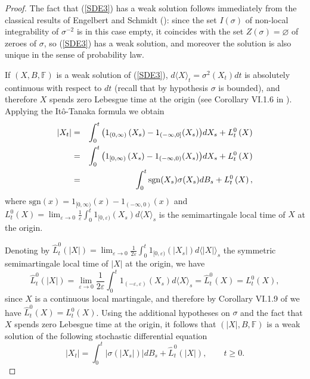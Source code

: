 \documentclass[reqno]{amsart}
\theoremstyle{definition}
\theoremstyle{remark}
\numberwithin{equation}{section}
\begin{document}
\begin{proof}
The fact that (\ref{SDE3}) has a weak solution follows immediately from the classical results of Engelbert and Schmidt (\cite{Engelbert-Schmidt}): since the set $I(\sigma)$ of non-local integrability of $\sigma^{-2}$ is in this case empty, it coincides with the set $Z(\sigma)=\varnothing$ of zeroes of $\sigma$, so (\ref{SDE3}) has a weak solution, and moreover the solution is also unique in the sense of probability law.

If $\left( X,B,\mathbb{F}\right) $ is a weak solution of (\ref{SDE3}), $d \langle X \rangle_t=\sigma^2(X_t) dt$ is absolutely continuous with respect to $dt$ (recall that by hypothesis $\sigma$ is bounded), and therefore $X$ spends zero Lebesgue time at the origin (see Corollary VI.1.6 in \cite{Revuz and Yor}). Applying the It\^{o}-Tanaka formula we obtain\begin{eqnarray}
\left\vert X_{t}\right\vert &=&\int_{0}^{t}\big(1_{(0,\infty)}\left( X_{s}\right)-1_{(-\infty,0]}(X_s)\big)dX_s+L_{t}^{0}\left( X\right) \notag\label{equation for |X|}\\
&=&\int_{0}^{t}\big(1_{[0,\infty)}\left( X_{s}\right)-1_{(-\infty,0)}(X_s)\big)dX_s+L_{t}^{0}\left( X\right) \notag\\
&=&\int_{0}^{t}\mathrm{sgn}(X_s)\sigma(X_s) dB_s+L_{t}^{0}\left( X\right),\notag
\end{eqnarray}where $\mathrm{sgn}(x)=1_{[0,\infty)}(x)-1_{(-\infty,0)}(x)$ and $L_t^0(X)=\lim_{\varepsilon\rightarrow0}\frac1\varepsilon\int_0^t 1_{[0,\varepsilon)}(X_s)d\langle X\rangle_s$ is the semimartingale local time of $X$ at the origin.

Denoting by $\widehat{L}^0_t(\vert X\vert)=\lim_{\varepsilon\rightarrow0}\frac1{2\varepsilon}\int_0^t 1_{[0,\varepsilon)}(\vert X_s\vert )d\langle \vert X\vert \rangle_s$ the symmetric semimartingale local time of $\vert X\vert$ at the origin, we have $$\widehat{L}^0_t(\vert X\vert)=\lim_{\varepsilon\rightarrow0}\frac1{2\varepsilon}\int_0^t 1_{(-\varepsilon,\varepsilon)}(X_s)d\langle X \rangle_s=\widehat{L}^0_t(X)=L^0_t(X),$$ since $X$ is a continuous local martingale, and therefore by Corollary VI.1.9 of \cite{Revuz and Yor} we have $\widehat{L}^0_t(X)=L_t^0 (X)$. Using the additional hypotheses on $\sigma $ and the fact that $X$ spends zero Lebesgue time at the origin, it follows that $(\vert X\vert,B,\mathbb{F})$ is a weak solution of the following stochastic differential equation \begin{equation}\label{aux3}
\left\vert X_{t}\right\vert =\int_{0}^{t}\left\vert \sigma \left( \left\vert
X_{s}\right\vert \right) \right\vert dB_{s}+\widehat{L}_{t}^{0}\left(\vert X\vert\right) ,\qquad
t\geq 0.
\end{equation}


\end{proof}
\end{document}
